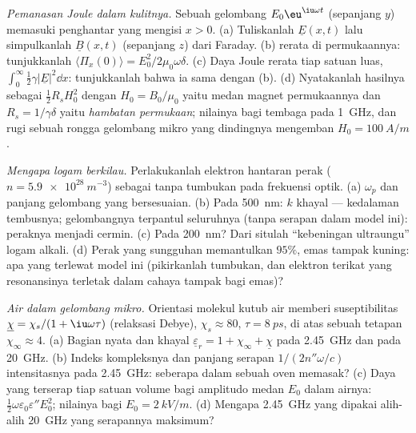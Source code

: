 \begin{exercise}[$\star\star\star$]\label{exo:b2:waves-in-media:10}
\emph{Pemanasan Joule dalam kulitnya.} Sebuah gelombang $E_0\eu^{\iu\omega t}$ (sepanjang $y$)
memasuki penghantar yang mengisi $x > 0$. (a) Tuliskanlah $\underline E(x, t)$ lalu simpulkanlah
$\underline B(x, t)$ (sepanjang $z$) dari Faraday. (b)  rerata di
permukaannya: tunjukkanlah $\langle\Pi_x(0)\rangle = E_0^2/2\mu_0\omega\delta$. (c) Daya Joule
rerata tiap satuan luas, $\int_0^\infty\tfrac12\gamma|\underline E|^2\dd x$: tunjukkanlah bahwa ia sama dengan
(b). (d) Nyatakanlah hasilnya sebagai $\tfrac12R_sH_0^2$ dengan $H_0 = B_0/\mu_0$ yaitu
medan magnet permukaannya dan $R_s = 1/\gamma\delta$ yaitu \emph{hambatan
permukaan}; nilainya bagi tembaga pada \qty{1}{GHz}, dan rugi sebuah
rongga gelombang mikro yang dindingnya mengemban $H_0 = \qty{100}{A/m}$.
\end{exercise}

\begin{exercise}[$\star\star\star$]\label{exo:b2:waves-in-media:11}
\emph{Mengapa logam berkilau.} Perlakukanlah elektron hantaran perak ($n =
\qty{5.9e28}{m^{-3}}$) sebagai  tanpa tumbukan pada frekuensi optik.
(a) $\omega_p$ dan panjang gelombang yang bersesuaian. (b) Pada \qty{500}{nm}: $k$
khayal --- kedalaman tembusnya; gelombangnya terpantul seluruhnya (tanpa
serapan dalam model ini): peraknya menjadi cermin. (c) Pada \qty{200}{nm}? Dari situlah
``kebeningan ultraungu'' logam alkali. (d) Perak yang sungguhan
memantulkan $95\%$, emas tampak kuning: apa yang terlewat model ini (pikirkanlah
tumbukan, dan elektron terikat yang resonansinya terletak dalam
cahaya tampak bagi emas)?
\end{exercise}

\begin{exercise}[$\star\star\star$]\label{exo:b2:waves-in-media:12}
\emph{Air dalam gelombang mikro.} Orientasi molekul kutub air
memberi suseptibilitas $\underline\chi = \chi_s/(1 + \iu\omega\tau)$ (relaksasi
Debye), $\chi_s \approx 80$, $\tau = \qty{8}{ps}$, di atas sebuah tetapan
$\chi_\infty \approx 4$. (a) Bagian nyata dan khayal $\underline\varepsilon_r = 1 + \chi_\infty
+ \underline\chi$ pada \qty{2.45}{GHz} dan pada \qty{20}{GHz}. (b) Indeks kompleksnya dan
panjang serapan $1/(2n''\omega/c)$ intensitasnya pada \qty{2.45}{GHz}: seberapa
dalam sebuah oven memasak? (c) Daya yang terserap tiap satuan volume bagi
amplitudo medan $E_0$ dalam airnya: $\tfrac12\omega\varepsilon_0\varepsilon''E_0^2$; nilainya bagi
$E_0 = \qty{2}{kV/m}$. (d) Mengapa \qty{2.45}{GHz} yang dipakai alih-alih
\qty{20}{GHz} yang serapannya maksimum?
\end{exercise}


